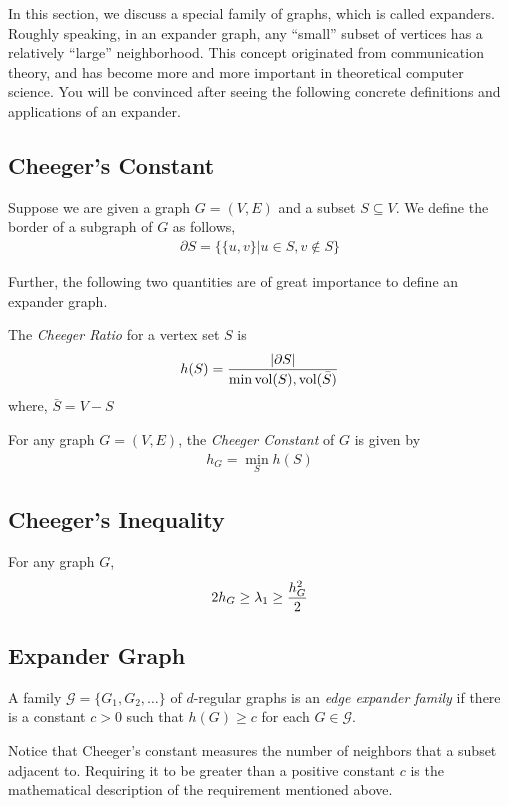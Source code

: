 In this section, we discuss a special family of graphs, which is
called expanders. Roughly speaking, in an expander graph, any
``small'' subset of vertices has a relatively ``large''
neighborhood. This concept originated from communication theory, and
has become more and more important in theoretical computer science.
You will be convinced after seeing the following concrete
definitions and applications of an expander.

\subsection{Cheeger's Constant}
Suppose we are given a graph $G=(V,E)$ and a subset $S\subseteq V$.
We define the border of a subgraph of $G$ as follows,
\begin{eqnarray*}
    \partial S=\{\{u,v\}|u\in S, v\not\in S\}
\end{eqnarray*}

Further, the following two quantities are of great importance to
define an expander graph.

\begin{definition}
    The \emph{Cheeger Ratio} for a vertex set $S$ is
    \begin{eqnarray*}
        h(S)={|\partial S|\over\min{\text{vol}(S),\text{vol}(\bar{S})}}
    \end{eqnarray*}
    where, $\bar{S}=V-S$
\end{definition}

\begin{definition}
    For any graph $G=(V,E)$, the \emph{Cheeger Constant} of $G$ is given by
    \begin{eqnarray*}
        h_G=\min_{S}h(S)
    \end{eqnarray*}
\end{definition}

\subsection{Cheeger's Inequality}
\begin{theorem}
    For any graph $G$,
    \begin{eqnarray}
        2h_G\ge \lambda_1\ge {h_G^2\over 2}\label{cheeger-ineq}
    \end{eqnarray}
\end{theorem}

\subsection{Expander Graph}
\begin{definition}
A family $\mathcal{G}=\{G_1, G_2,\dots\}$ of $d$-regular graphs is
an \emph{edge expander family} if there is a constant $c>0$ such
that $h(G)\ge c$ for each $G\in \mathcal{G}$.
\end{definition}
Notice that Cheeger's constant measures the number of neighbors that
a subset adjacent to. Requiring it to be greater than a positive
constant $c$ is the mathematical description of the requirement
mentioned above.

